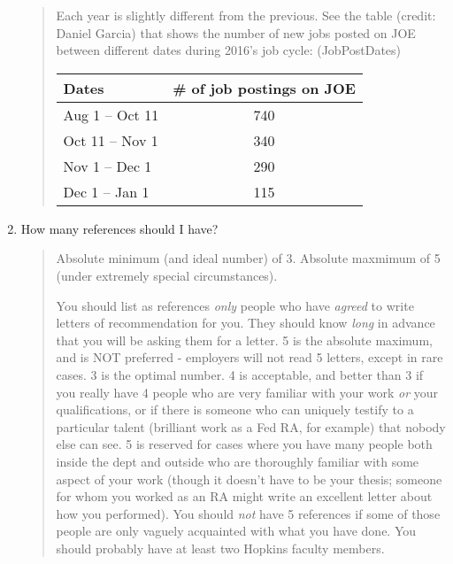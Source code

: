 \documentclass{\classes/econtex}
\providecommand\phantomsection{}
\begin{document}
\begin{enumerate}
      \begin{quote}
        Each year is slightly different from the previous. See the table (credit: Daniel Garcia) 
        that shows the number of new jobs posted on JOE between different dates 
        during 2016's job cycle:
        \ifdvi\phantomsection\hypertarget{JobPostDates}{(JobPostDates)}\fi
        \begin{table}[h]
          \centering
          \begin{tabular}{|l|c|}
            \hline
            Dates                   & \# of job postings on JOE \\ \hline
            Aug 1 -- Oct 11   & 740                       \\ \hline
            Oct 11 -- Nov 1 & 340                       \\ \hline
            Nov 1 -- Dec 1 & 290                       \\ \hline
            Dec 1 -- Jan 1  & 115                       \\ \hline
          \end{tabular}
        \end{table}
      \end{quote}

  \item How many references should I have?

    \begin{quote}
      Absolute minimum (and ideal number) of 3.  Absolute maxmimum of 5 (under
      extremely special circumstances).  

      You should list as references \textit{only} people who have \textit{agreed}
      to write letters of recommendation for you.  They should know \textit{long} in advance that you will be asking them for a letter.  5 is the absolute
      maximum, and is NOT preferred - employers will not read 5 letters,
      except in rare cases.  3 is the optimal number.  4 is acceptable, and
      better than 3 if you really have 4 people who are very familiar with
      your work \textit{or} your qualifications, or if there is someone who can
      uniquely testify to a particular talent (brilliant work as a Fed RA,
      for example) that nobody else can see.  5 is reserved for cases where
      you have many people both inside the dept and outside who are
      thoroughly familiar with some aspect of your work (though it doesn't
      have to be your thesis; someone for whom you worked as an RA might
      write an excellent letter about how you performed).  You should \textit{not} have 5 references if some of those people are only vaguely
      acquainted with what you have done.  You should probably have at least
      two Hopkins faculty members.


\end{quote}
\end{enumerate}
\end{document}
